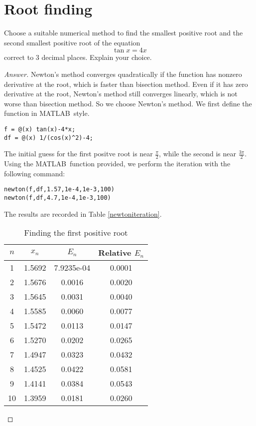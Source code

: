 \section{Root finding}
Choose a suitable numerical method to find the smallest positive root and the second smallest positive root of the equation
\[ \tan x = 4x \]
correct to 3 decimal places.
Explain your choice.
\begin{proof}[Answer]
Newton's method converges quadratically if the function has nonzero derivative at the root, which is faster than bisection method.
Even if it has zero derivative at the root, Newton's method still converges linearly, which is not worse than bisection method.
So we choose Newton's method.
We first define the function in MATLAB\texttrademark\ style.
\begin{lstlisting}[style=Matlab-editor]
f = @(x) tan(x)-4*x;
df = @(x) 1/(cos(x)^2)-4;
\end{lstlisting}
The initial guess for the first positve root is near \(\frac{\pi}{2}\), while the second is near \(\frac{3\pi}{2}\).
Using the MATLAB\texttrademark\ function provided, we perform the iteration with the following command:
\begin{lstlisting}[style=Matlab-editor]
newton(f,df,1.57,1e-4,1e-3,100)
newton(f,df,4.7,1e-4,1e-3,100)
\end{lstlisting}
The results are recorded in Table \ref{newtoniteration}.
\begin{table}[htbp]
	\begin{subtable}[t]{.48\linewidth}
		\centering
		\caption{Finding the first positive root}
		\begin{tabular}[t]{|c|c|c|c|}
		\hline
		$n$ & \(x_n\) & \(E_n\) & Relative \(E_n\) \\	\hline
		1	&	1.5692	&	7.9235e-04	&	0.0001\\	\hline
		2	&	1.5676	&	0.0016	&	0.0020	\\	\hline
		3	&	1.5645	&	0.0031	&	0.0040	\\	\hline
		4	&	1.5585	&	0.0060	&	0.0077	\\	\hline
		5	&	1.5472	&	0.0113	&	0.0147	\\	\hline
		6	&	1.5270	&	0.0202	&	0.0265	\\	\hline
		7	&	1.4947	&	0.0323	&	0.0432	\\	\hline
		8	&	1.4525	&	0.0422	&	0.0581	\\	\hline
		9	&	1.4141	&	0.0384	&	0.0543	\\	\hline
		10	&	1.3959	&	0.0181	&	0.0260	\\	\hline

\end{tabular}
\end{subtable}
\end{table}
\end{proof}
